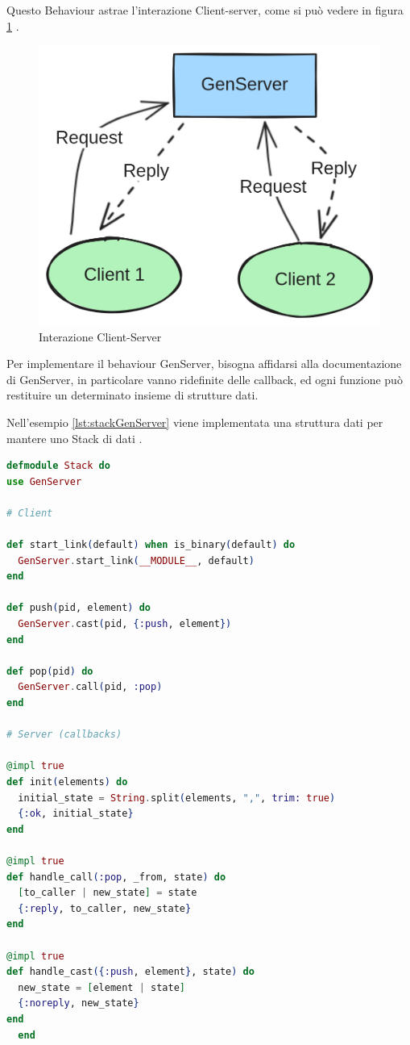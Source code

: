 Questo Behaviour astrae l'interazione Client-server, come si può vedere
in figura \ref{fig:client_server}  \cite{GenServe6:online}.

\begin{figure}[!htp]
    \centering
    \includegraphics[keepaspectratio=true,scale=0.20]{images/GenServer.png}
	\caption{Interazione Client-Server}
  	\label{fig:client_server}
\end{figure}

Per implementare il behaviour GenServer, bisogna affidarsi alla
documentazione di GenServer, in particolare vanno ridefinite delle
callback, ed ogni funzione può restituire un determinato insieme di
strutture dati.

Nell'esempio \ref{lst:stackGenServer} viene implementata una struttura dati
per mantere uno Stack di dati \cite{GenServe6:online}.

\begin{lstlisting}[language=elixir, caption={Implementazione Stack},captionpos=b,
	label={lst:stackGenServer}]
defmodule Stack do
use GenServer

# Client

def start_link(default) when is_binary(default) do
  GenServer.start_link(__MODULE__, default)
end

def push(pid, element) do
  GenServer.cast(pid, {:push, element})
end

def pop(pid) do
  GenServer.call(pid, :pop)
end

# Server (callbacks)

@impl true
def init(elements) do
  initial_state = String.split(elements, ",", trim: true)
  {:ok, initial_state}
end

@impl true
def handle_call(:pop, _from, state) do
  [to_caller | new_state] = state
  {:reply, to_caller, new_state}
end

@impl true
def handle_cast({:push, element}, state) do
  new_state = [element | state]
  {:noreply, new_state}
end
  end
\end{lstlisting}

